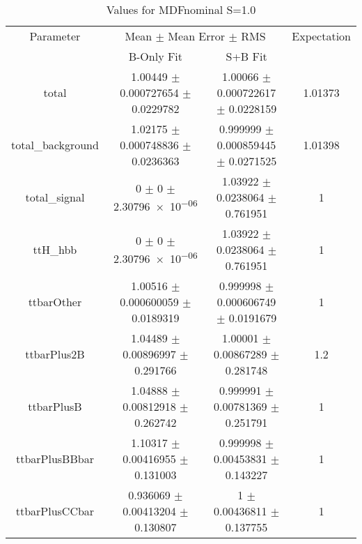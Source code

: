\begin{table}
\centering
\caption{Values for MDFnominal S=1.0}
\begin{tabular}{cccc}
\toprule
Parameter & \multicolumn{2}{c}{Mean $\pm$ Mean Error $\pm$ RMS} & Expectation\\
 & B-Only Fit & S+B Fit & \\
\midrule
total & \num{1.00449} $\pm$ \num{0.000727654} $\pm$ \num{0.0229782} & \num{1.00066} $\pm$ \num{0.000722617} $\pm$ \num{0.0228159} & \num{1.01373}\\
total\_background & \num{1.02175} $\pm$ \num{0.000748836} $\pm$ \num{0.0236363} & \num{0.999999} $\pm$ \num{0.000859445} $\pm$ \num{0.0271525} & \num{1.01398}\\
total\_signal & \num{0} $\pm$ \num{0} $\pm$ \num{2.30796e-06} & \num{1.03922} $\pm$ \num{0.0238064} $\pm$ \num{0.761951} & \num{1}\\
ttH\_hbb & \num{0} $\pm$ \num{0} $\pm$ \num{2.30796e-06} & \num{1.03922} $\pm$ \num{0.0238064} $\pm$ \num{0.761951} & \num{1}\\
ttbarOther & \num{1.00516} $\pm$ \num{0.000600059} $\pm$ \num{0.0189319} & \num{0.999998} $\pm$ \num{0.000606749} $\pm$ \num{0.0191679} & \num{1}\\
ttbarPlus2B & \num{1.04489} $\pm$ \num{0.00896997} $\pm$ \num{0.291766} & \num{1.00001} $\pm$ \num{0.00867289} $\pm$ \num{0.281748} & \num{1.2}\\
ttbarPlusB & \num{1.04888} $\pm$ \num{0.00812918} $\pm$ \num{0.262742} & \num{0.999991} $\pm$ \num{0.00781369} $\pm$ \num{0.251791} & \num{1}\\
ttbarPlusBBbar & \num{1.10317} $\pm$ \num{0.00416955} $\pm$ \num{0.131003} & \num{0.999998} $\pm$ \num{0.00453831} $\pm$ \num{0.143227} & \num{1}\\
ttbarPlusCCbar & \num{0.936069} $\pm$ \num{0.00413204} $\pm$ \num{0.130807} & \num{1} $\pm$ \num{0.00436811} $\pm$ \num{0.137755} & \num{1}\\
\bottomrule
\end{tabular}
\end{table}